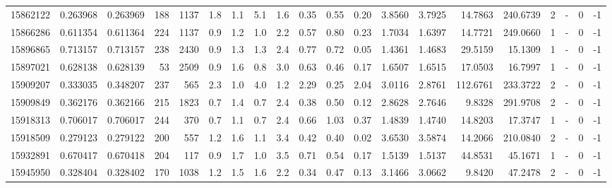 \begin{tabular}{rrrrrrrrrrrrrrrrrlrl}
  15862122 & 0.263968 &   0.263969 &  188 & 1137 &      1.8 &      1.1 &     5.1 &      1.6 &       0.35 &        0.55 &        0.20 &  3.8560 &  3.7925 &   14.7863 &  240.6739 &       2 &             - &        0 &        -1 \\
  15866286 & 0.611354 &   0.611364 &  224 & 1137 &      0.9 &      1.2 &     1.0 &      2.2 &       0.57 &        0.80 &        0.23 &  1.7034 &  1.6397 &   14.7721 &  249.0660 &       1 &             - &        0 &        -1 \\
  15896865 & 0.713157 &   0.713157 &  238 & 2430 &      0.9 &      1.3 &     1.3 &      2.4 &       0.77 &        0.72 &        0.05 &  1.4361 &  1.4683 &   29.5159 &   15.1309 &       1 &             - &        0 &        -1 \\
  15897021 & 0.628138 &   0.628139 &   53 & 2509 &      0.9 &      1.6 &     0.8 &      3.0 &       0.63 &        0.46 &        0.17 &  1.6507 &  1.6515 &   17.0503 &   16.7997 &       1 &             - &        0 &        -1 \\
  15909207 & 0.333035 &   0.348207 &  237 &  565 &      2.3 &      1.0 &     4.0 &      1.2 &       2.29 &        0.25 &        2.04 &  3.0116 &  2.8761 &  112.6761 &  233.3722 &       2 &             - &        0 &        -1 \\
  15909849 & 0.362176 &   0.362166 &  215 & 1823 &      0.7 &      1.4 &     0.7 &      2.4 &       0.38 &        0.50 &        0.12 &  2.8628 &  2.7646 &    9.8328 &  291.9708 &       2 &             - &        0 &        -1 \\
  15918313 & 0.706017 &   0.706017 &  244 &  370 &      0.7 &      1.1 &     0.7 &      2.4 &       0.66 &        1.03 &        0.37 &  1.4839 &  1.4740 &   14.8203 &   17.3747 &       1 &             - &        0 &        -1 \\
  15918509 & 0.279123 &   0.279122 &  200 &  557 &      1.2 &      1.6 &     1.1 &      3.4 &       0.42 &        0.40 &        0.02 &  3.6530 &  3.5874 &   14.2066 &  210.0840 &       2 &             - &        0 &        -1 \\
  15932891 & 0.670417 &   0.670418 &  204 &  117 &      0.9 &      1.7 &     1.0 &      3.5 &       0.71 &        0.54 &        0.17 &  1.5139 &  1.5137 &   44.8531 &   45.1671 &       1 &             - &        0 &        -1 \\
  15945950 & 0.328404 &   0.328402 &  170 & 1038 &      1.2 &      1.5 &     1.6 &      2.2 &       0.34 &        0.47 &        0.13 &  3.1466 &  3.0662 &    9.8420 &   47.2478 &       2 &             - &        0 &        -1 \\

\end{tabular}
